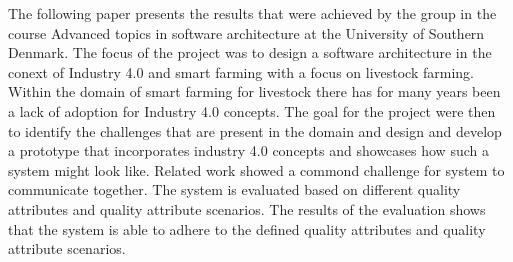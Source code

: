The following paper presents the results that were achieved by the group in the course Advanced topics in software architecture at the University of Southern Denmark. The focus of the project was to design a software architecture in the conext of Industry 4.0 and smart farming with a focus on livestock farming. Within the domain of smart farming for livestock there has for many years been a lack of adoption for Industry 4.0 concepts. The goal for the project were then to identify the challenges that are present in the domain and design and develop a prototype that incorporates industry 4.0 concepts and showcases how such a system might look like. Related work showed a commond challenge for system to communicate together. The system is evaluated based on different quality attributes and quality attribute scenarios. The results of the evaluation shows that the system is able to adhere to the defined quality attributes and quality attribute scenarios.